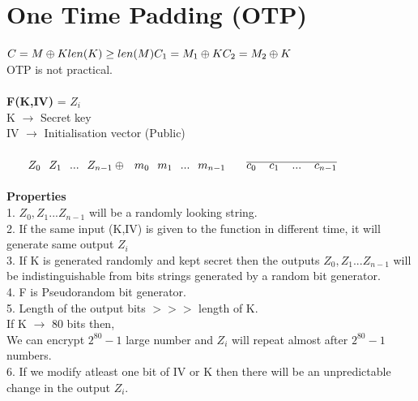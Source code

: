 \documentclass[11pt]{article}
\begin{document}
\section*{One Time Padding (OTP)}
$C = M \oplus K \\
len(K) \geq len(M) \\
C_{1} = M_{1} \oplus K \\
C_{2} = M_{2} \oplus K $ \\
OTP is not practical. \\\\
\textbf{F(K,IV)} = $Z_{i}$ \\
K $\rightarrow$ Secret key \\
IV $\rightarrow$ Initialisation vector (Public)\\\\
$
\hspace*{0.65cm} Z_{0} \hspace*{0.25cm} Z_{1} \hspace*{0.25cm} ... \hspace*{0.25cm} Z_{n-1} \\
\oplus \hspace*{0.25cm} m_{0} \hspace*{0.25cm} m_{1} \hspace*{0.25cm} ... \hspace*{0.25cm} m_{n-1} \\
\hspace*{0.65cm} \overline{c_{0} \hspace*{0.40cm} c_{1} \hspace*{0.40cm} ... \hspace*{0.40cm} c_{n-1}} 
$ \\\\
\textbf{Properties}\\
1. $Z_{0},Z_{1} ... Z_{n-1}$ will be a randomly looking string. \\
2. If the same input (K,IV) is given to the function in different time, it will generate same output $Z_{i}$ \\
3. If K is generated randomly and kept secret then the outputs $Z_{0},Z_{1} ... Z_{n-1}$ will be indistinguishable from bits strings generated by a random bit generator. \\
4. F is Pseudorandom bit generator. \\
5. Length of the output bits $>>>$ length of K. \\
\hspace*{1cm}If K $\rightarrow$ 80 bits then,\\
\hspace*{1cm}We can encrypt $2^{80} - 1$ large number and $Z_{i}$ will repeat almost after $2^{80} - 1$ numbers.\\
6. If we modify atleast one bit of IV or K then there will be an unpredictable change in the output $Z_{i}$. \\
\end{document}

